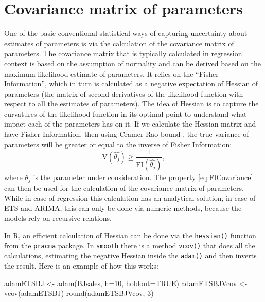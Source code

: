 \documentclass[
]{book}
\newenvironment{Shaded}{\begin{snugshade}}{\end{snugshade}}
\newcommand{\AttributeTok}[1]{\textcolor[rgb]{0.77,0.63,0.00}{#1}}
\newcommand{\ConstantTok}[1]{\textcolor[rgb]{0.00,0.00,0.00}{#1}}
\newcommand{\DecValTok}[1]{\textcolor[rgb]{0.00,0.00,0.81}{#1}}
\newcommand{\FunctionTok}[1]{\textcolor[rgb]{0.00,0.00,0.00}{#1}}
\newcommand{\NormalTok}[1]{#1}
\newcommand{\OtherTok}[1]{\textcolor[rgb]{0.56,0.35,0.01}{#1}}
\theoremstyle{definition}
\theoremstyle{definition}
\theoremstyle{definition}
\theoremstyle{definition}
\theoremstyle{remark}
\begin{document}
\hypertarget{ADAMUncertaintyVCOV}{%
\section{Covariance matrix of parameters}\label{ADAMUncertaintyVCOV}}

One of the basic conventional statistical ways of capturing uncertainty about estimates of parameters is via the calculation of the covariance matrix of parameters. The covariance matrix that is typically calculated in regression context is based on the assumption of normality and can be derived based on the maximum likelihood estimate of parameters. It relies on the ``Fisher Information'', which in turn is calculated as a negative expectation of Hessian of parameters (the matrix of second derivatives of the likelihood function with respect to all the estimates of parameters). The idea of Hessian is to capture the curvatures of the likelihood function in its optimal point to understand what impact each of the parameters has on it. If we calculate the Hessian matrix and have Fisher Information, then using Cramer-Rao bound \citep{WikipediaCramerRaoBound}, the true variance of parameters will be greater or equal to the inverse of Fisher Information:
\begin{equation}
    \mathrm{V}(\hat{\theta_j}) \geq \frac{1}{\mathrm{FI}(\hat{\theta_j})} ,
    \label{eq:FICovariance}
\end{equation}
where \(\theta_j\) is the parameter under consideration. The property \eqref{eq:FICovariance} can then be used for the calculation of the covariance matrix of parameters. While in case of regression this calculation has an analytical solution, in case of ETS and ARIMA, this can only be done via numeric methods, because the models rely on recursive relations.

In R, an efficient calculation of Hessian can be done via the \texttt{hessian()} function from the \texttt{pracma} package. In \texttt{smooth} there is a method \texttt{vcov()} that does all the calculations, estimating the negative Hessian inside the \texttt{adam()} and then inverts the result. Here is an example of how this works:

\begin{Shaded}
\begin{Highlighting}[]
\NormalTok{adamETSBJ }\OtherTok{\textless{}{-}} \FunctionTok{adam}\NormalTok{(BJsales, }\AttributeTok{h=}\DecValTok{10}\NormalTok{, }\AttributeTok{holdout=}\ConstantTok{TRUE}\NormalTok{)}
\NormalTok{adamETSBJVcov }\OtherTok{\textless{}{-}} \FunctionTok{vcov}\NormalTok{(adamETSBJ)}
\FunctionTok{round}\NormalTok{(adamETSBJVcov, }\DecValTok{3}\NormalTok{)}
\end{Highlighting}
\end{Shaded}
\end{document}
